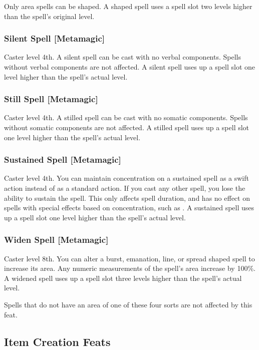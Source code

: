 Only area spells can be shaped. A shaped spell uses a spell slot two levels higher than the spell's original level.

\subsubsection{Silent Spell [Metamagic]}
 Caster level 4th.
 A silent spell can be cast with no verbal components. Spells without verbal components are not affected. A silent spell uses up a spell slot one level higher than the spell's actual level.

\subsubsection{Still Spell [Metamagic]}
 Caster level 4th.
 A stilled spell can be cast with no somatic components. Spells without somatic components are not affected. A stilled spell uses up a spell slot one level higher than the spell's actual level.

\subsubsection{Sustained Spell [Metamagic]}
\featpre Caster level 4th.
\featben You can maintain concentration on a sustained spell as a swift action instead of as a standard action. If you cast any other spell, you lose the ability to sustain the spell. This only affects spell duration, and has no effect on spells with special effects based on concentration, such as . A sustained spell uses up a spell slot one level higher than the spell's actual level.

\subsubsection{Widen Spell [Metamagic]}
 Caster level 8th.
 You can alter a burst, emanation, line, or spread shaped spell to increase its area. Any numeric measurements of the spell's area increase by 100\%. A widened spell uses up a spell slot three levels higher than the spell's actual level.
\par Spells that do not have an area of one of these four sorts are not affected by this feat.

\subsection{Item Creation Feats}


